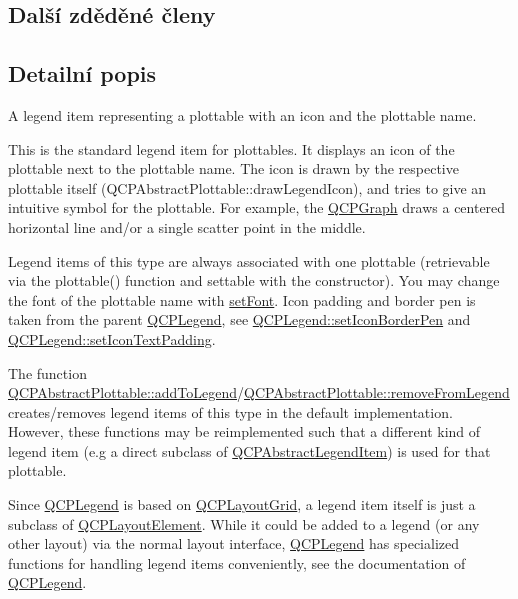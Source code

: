 \subsection*{Další zděděné členy}


\subsection{Detailní popis}
A legend item representing a plottable with an icon and the plottable name. 

This is the standard legend item for plottables. It displays an icon of the plottable next to the plottable name. The icon is drawn by the respective plottable itself (Q\+C\+P\+Abstract\+Plottable\+::draw\+Legend\+Icon), and tries to give an intuitive symbol for the plottable. For example, the \hyperlink{classQCPGraph}{Q\+C\+P\+Graph} draws a centered horizontal line and/or a single scatter point in the middle.

Legend items of this type are always associated with one plottable (retrievable via the plottable() function and settable with the constructor). You may change the font of the plottable name with \hyperlink{classQCPAbstractLegendItem_a409c53455d8112f71d70c0c43eb10265}{set\+Font}. Icon padding and border pen is taken from the parent \hyperlink{classQCPLegend}{Q\+C\+P\+Legend}, see \hyperlink{classQCPLegend_a2f2c93d18a651f4ff294bb3f026f49b8}{Q\+C\+P\+Legend\+::set\+Icon\+Border\+Pen} and \hyperlink{classQCPLegend_a62973bd69d5155e8ea3141366e8968f6}{Q\+C\+P\+Legend\+::set\+Icon\+Text\+Padding}.

The function \hyperlink{classQCPAbstractPlottable_a70f8cabfd808f7d5204b9f18c45c13f5}{Q\+C\+P\+Abstract\+Plottable\+::add\+To\+Legend}/\hyperlink{classQCPAbstractPlottable_aa1f350e510326d012b9a9c9249736c83}{Q\+C\+P\+Abstract\+Plottable\+::remove\+From\+Legend} creates/removes legend items of this type in the default implementation. However, these functions may be reimplemented such that a different kind of legend item (e.\+g a direct subclass of \hyperlink{classQCPAbstractLegendItem}{Q\+C\+P\+Abstract\+Legend\+Item}) is used for that plottable.

Since \hyperlink{classQCPLegend}{Q\+C\+P\+Legend} is based on \hyperlink{classQCPLayoutGrid}{Q\+C\+P\+Layout\+Grid}, a legend item itself is just a subclass of \hyperlink{classQCPLayoutElement}{Q\+C\+P\+Layout\+Element}. While it could be added to a legend (or any other layout) via the normal layout interface, \hyperlink{classQCPLegend}{Q\+C\+P\+Legend} has specialized functions for handling legend items conveniently, see the documentation of \hyperlink{classQCPLegend}{Q\+C\+P\+Legend}. 


